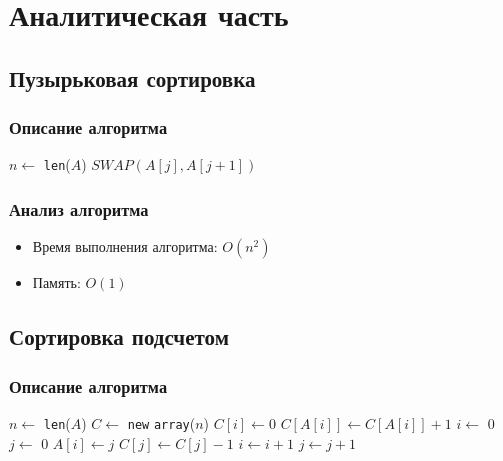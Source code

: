 \chapter{Аналитическая часть}

\section{Пузырьковая сортировка}

\subsection{Описание алгоритма}

\begin{algorithmic}
\State $n \gets$ \texttt{len}($A$)
\State $SWAP(A[j], A[j + 1])$
\EndIf
\EndFor
\EndFor
\EndProcedure
\end{algorithmic}

\subsection{Анализ алгоритма}

\begin{itemize}
    \item Время выполнения алгоритма: $O(n^2)$
    \item Память: $O(1)$
\end{itemize}

\section{Сортировка подсчетом}

\subsection{Описание алгоритма}

\begin{algorithmic}
\State $n \gets$ \texttt{len}($A$)
\State $C \gets$ \texttt{new} \texttt{array}($n$)
\State $C[i] \gets 0$
\EndFor
{}
\State $C[A[i]] \gets C[A[i]] + 1$
\EndFor
\State $i \gets$ 0
\State $j \gets$ 0
\State $A[i] \gets j$
\State $C[j] \gets C[j] - 1$
\State $i \gets i + 1$
\Else
\State $j \gets j + 1$
\EndIf
\EndWhile
\EndProcedure
\end{algorithmic}

